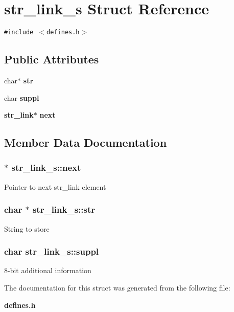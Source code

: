 \section{str\_\-link\_\-s  Struct Reference}
\label{structstr__link__s}
{\tt \#include $<$defines.h$>$}

\subsection*{Public Attributes}
\begin{CompactItemize}
\item 
char$\ast$ {\bf str}
\item 
char {\bf suppl}
\item 
{\bf str\_\-link}$\ast$ {\bf next}
\end{CompactItemize}


\subsection{Member Data Documentation}
\subsubsection{ $\ast$ str\_\-link\_\-s::next}\label{structstr__link__s_m2}


Pointer to next str\_\-link element 
\subsubsection{\setlength{\rightskip}{0pt plus 5cm}char $\ast$ str\_\-link\_\-s::str}\label{structstr__link__s_m0}


String to store 
\subsubsection{\setlength{\rightskip}{0pt plus 5cm}char str\_\-link\_\-s::suppl}\label{structstr__link__s_m1}


8-bit additional information 

The documentation for this struct was generated from the following file:\begin{CompactItemize}
\item 
{\bf defines.h}\end{CompactItemize}
